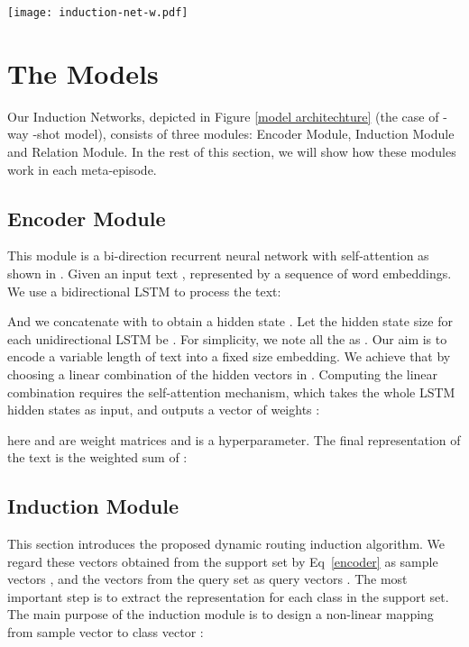 \documentclass[11pt,a4paper]{article}
\begin{document}
\begin{figure*}[t]
\centering
\small
\texttt{[image: induction-net-w.pdf]}
\caption{Induction Networks architecture for a -way -shot (, ) problem with one query example}
\centering
\label{model architechture}
\end{figure*}

\section{The Models}
Our Induction Networks, depicted in Figure \ref{model architechture} (the case of -way -shot model), consists of three modules: Encoder Module, Induction Module and Relation Module. In the rest of this section, we will show how these modules work in each meta-episode. 

\subsection{Encoder Module}
This module is a bi-direction recurrent neural network with self-attention as shown in \citet{lin2017structured}. Given an input text , represented by a sequence of word embeddings. We use a bidirectional LSTM to process the text:


And we concatenate  with  to obtain a hidden state . Let the hidden state size for each unidirectional LSTM be .
For simplicity, we note all the  as . Our aim is to encode a variable length of text into a fixed size embedding. We achieve that by choosing a linear combination of the   hidden vectors in . Computing the linear combination requires the self-attention mechanism, which takes the whole LSTM hidden states  as input, and outputs a vector of weights :

here  and  are weight matrices and  is a hyperparameter. The final representation  of the text is the weighted sum of :


\subsection{Induction Module}
This section introduces the proposed dynamic routing induction algorithm. We regard these vectors  obtained from the support set  by Eq~\ref{encoder} as sample vectors , and the vectors  from the query set  as query vectors . The most important step is to extract the representation for each class in the support set. The main purpose of the induction module is to design a non-linear mapping from sample vector  to class vector :\\
\end{document}
